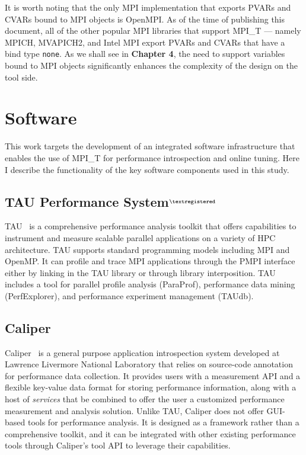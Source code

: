 \par It is worth noting that the only MPI implementation that exports PVARs and CVARs bound to MPI objects is OpenMPI. As of the time of publishing this document, all of the other popular MPI libraries that support MPI\_T --- namely MPICH, MVAPICH2, and Intel MPI export PVARs and CVARs that have a bind type \verb+none+. As we shall see in \textbf{Chapter 4}, the need to support variables bound to MPI objects significantly enhances the complexity of the design on the tool side.

\section {Software}
This work targets the development of an integrated software infrastructure that enables the use of MPI\_T for performance introspection and online tuning. Here I describe the functionality of the key software components used in this study.
\subsection{TAU Performance System$^{\tiny{\textregistered}}$}
TAU~\cite{Shende:2006:TPP:1125980.1125982} is a comprehensive performance analysis toolkit that offers capabilities to instrument and measure scalable parallel applications on a variety of HPC architecture.
TAU supports standard programming models including MPI and OpenMP. It can profile and trace MPI applications through the PMPI interface either by linking in the TAU library or through library interposition.
TAU includes a tool for parallel profile analysis (ParaProf), performance data mining (PerfExplorer), and performance experiment management (TAUdb).

\subsection {Caliper}
Caliper~\cite{CALIPER} is a general purpose application introspection system developed at Lawrence Livermore National Laboratory that relies on source-code annotation for performance data collection. It provides users with a measurement API and a flexible key-value data format for storing performance information, along with a host of \textit{services} that be combined to offer the user a customized performance measurement and analysis solution. Unlike TAU, Caliper does not offer GUI-based tools for performance analysis. It is designed as a framework rather than a comprehensive toolkit, and it can be integrated with other existing performance tools through Caliper's tool API to leverage their capabilities.

